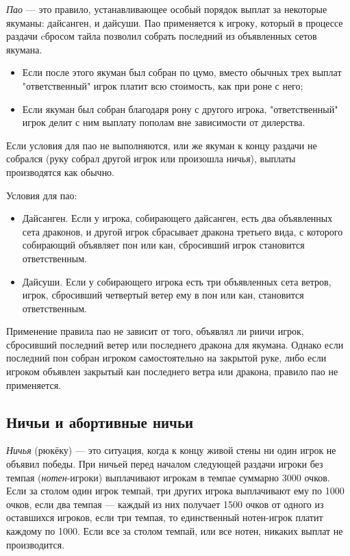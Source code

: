 \textit{Пао} --- это правило, устанавливающее особый порядок выплат за некоторые якуманы: дайсанген, и дайсуши. 
Пао применяется к игроку, который в процессе раздачи cбросом тайла позволил собрать последний из объявленных сетов якумана.
\begin{itemize}
	\item Если после этого якуман был собран по цумо, вместо обычных трех выплат "ответственный" игрок платит всю стоимость, как при роне с него;
	\item Если якуман был собран благодаря рону с другого игрока, "ответственный" игрок делит с ним выплату пополам вне зависимости от дилерства.
\end{itemize}

Если условия для пао не выполняются, или же якуман к концу раздачи не собрался (руку собрал другой игрок или произошла ничья), выплаты производятся как обычно.

Условия для пао:
\begin{itemize}
	\item Дайсанген. Если у игрока, собирающего дайсанген, есть два объявленных сета драконов, и другой игрок сбрасывает дракона третьего вида, с которого собирающий объявляет пон или кан, сбросивший игрок становится ответственным.
	\item Дайсуши. Если у собирающего игрока есть три объявленных сета ветров, игрок, сбросивший четвертый ветер ему в пон или кан, становится ответственным.
\end{itemize}

Применение правила пао не зависит от того, объявлял ли риичи игрок, сбросивший последний ветер или последнего дракона для якумана. Однако если последний пон собран игроком самостоятельно на закрытой руке, либо если игроком объявлен закрытый кан последнего ветра или дракона, правило пао не применяется.

\subsection{Ничьи и абортивные ничьи}

\textit{Ничья} (рюкёку) --- это ситуация, когда к концу живой стены ни один игрок не объявил победы. При ничьей перед началом следующей раздачи игроки без темпая (\textit{нотен}-игроки) выплачивают игрокам в темпае суммарно 3000 очков. Если за столом один игрок темпай, три других игрока выплачивают ему по 1000 очков, если два темпая --- каждый из них получает 1500 очков от одного из оставшихся игроков, если три темпая, то единственный нотен-игрок платит каждому по 1000. Если все за столом темпай, или все нотен, никаких выплат не производится.

